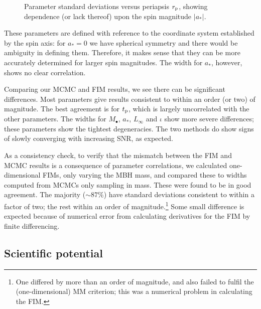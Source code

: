 \begin{figure}
\caption{Parameter standard deviations versus periapsis $r_\mathrm{p}$, showing dependence (or lack thereof) upon the spin magnitude $|a_\ast|$.}
\label{fig:sigmas-spin}
\end{figure}
These parameters are defined with reference to the coordinate system established by the spin axis: for $a_\ast = 0$ we have spherical symmetry and there would be ambiguity in defining them. Therefore, it makes sense that they can be more accurately determined for larger spin magnitudes. The width for $a_\ast$, however, shows no clear correlation.

Comparing our MCMC and FIM results, we see there can be significant differences. Most parameters give results consistent to within an order (or two) of magnitude. The best agreement is for $t_\mathrm{p}$, which is largely uncorrelated with the other parameters. The widths for $M_\bullet$, $a_\ast$, $L_\infty$ and $\iota$ show more severe differences; these parameters show the tightest degeneracies. The two methods do show signs of slowly converging with increasing SNR, as expected.

As a consistency check, to verify that the mismatch between the FIM and MCMC results is a consequence of parameter correlations, we calculated one-dimensional FIMs, only varying the MBH mass, and compared these to widths computed from MCMCs only sampling in mass. These were found to be in good agreement. The majority ($\sim 87\%$) have standard deviations consistent to within a factor of two; the rest within an order of magnitude.\footnote{One differed by more than an order of magnitude, and also failed to fulfil the (one-dimensional) MM criterion; this was a numerical problem in calculating the FIM.} Some small difference is expected because of numerical error from calculating derivatives for the FIM by finite differencing.

\subsection{Scientific potential}

